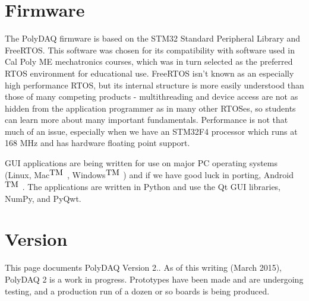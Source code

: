 \hypertarget{index_Firmware}{}\section{Firmware}\label{index_Firmware}
The Poly\-D\-A\-Q firmware is based on the S\-T\-M32 Standard Peripheral Library and Free\-R\-T\-O\-S. This software was chosen for its compatibility with software used in Cal Poly M\-E mechatronics courses, which was in turn selected as the preferred R\-T\-O\-S environment for educational use. Free\-R\-T\-O\-S isn't known as an especially high performance R\-T\-O\-S, but its internal structure is more easily understood than those of many competing products -\/ multithreading and device access are not as hidden from the application programmer as in many other R\-T\-O\-Ses, so students can learn more about many important fundamentals. Performance is not that much of an issue, especially when we have an S\-T\-M32\-F4 processor which runs at 168 M\-Hz and has hardware floating point support.

G\-U\-I applications are being written for use on major P\-C operating systems (Linux, Mac$^{\mbox{T\-M}}$ , Windows$^{\mbox{T\-M}}$ ) and if we have good luck in porting, Android$^{\mbox{T\-M}}$ . The applications are written in Python and use the Qt G\-U\-I libraries, Num\-Py, and Py\-Qwt.\hypertarget{index_Version}{}\section{Version}\label{index_Version}
This page documents Poly\-D\-A\-Q Version 2.. As of this writing (March 2015), Poly\-D\-A\-Q 2 is a work in progress. Prototypes have been made and are undergoing testing, and a production run of a dozen or so boards is being produced. 